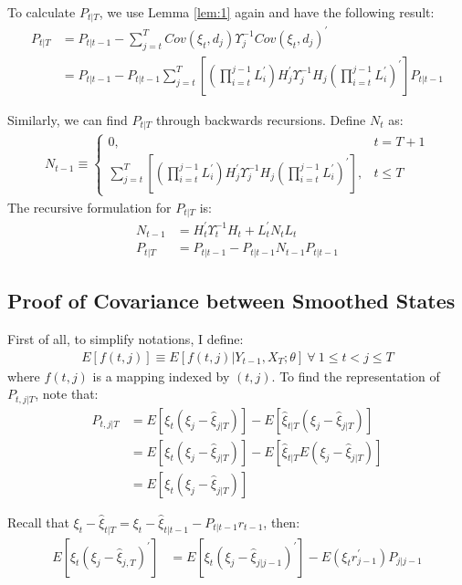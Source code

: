 \documentclass[12pt]{article}
\numberwithin{equation}{section}
\begin{document}
To calculate $P_{t|T}$, we use Lemma \ref{lem:1} again and have the following result:
\begin{align*}
    P_{t|T} &= P_{t|t-1} - \sum_{j=t}^TCov(\xi_t,d_j)\Upsilon_j^{-1}Cov(\xi_t,d_j)^{'} \\
    &=P_{t|t-1} - P_{t|t-1}\sum_{j=t}^{T}\left[\left(\prod_{i=t}^{j-1}L_{i}^{'}\right)H_j^{'}\Upsilon_j^{-1}H_j\left(\prod_{i=t}^{j-1}L_{i}^{'}\right)^{'}\right]P_{t|t-1}
\end{align*}

Similarly, we can find $P_{t|T}$ through backwards recursions. Define $N_t$ as:
\begin{align*}
    N_{t-1} \equiv \begin{cases}
        0, & t=T+1 \\
        \sum_{j=t}^{T}\left[\left(\prod_{i=t}^{j-1}L_{i}^{'}\right)H_j^{'}\Upsilon_j^{-1}H_j\left(\prod_{i=t}^{j-1}L_{i}^{'}\right)^{'}\right], & t\leq T
    \end{cases}
\end{align*}
The recursive formulation for $P_{t|T}$ is:
\begin{align*}
    N_{t-1} &= H_t^{'}\Upsilon_t^{-1}H_t + L_t^{'}N_tL_t \\
    P_{t|T} &= P_{t|t-1}- P_{t|t-1}N_{t-1}P_{t|t-1} 
\end{align*}

\subsection{Proof of Covariance between Smoothed States} \label{ap:cov_smooth}
First of all, to simplify notations, I define: 
\begin{align*}
    E[f(t,j)]\equiv E[f(t,j)|Y_{t-1},X_T;\theta] \  \forall\  1\leq t < j \leq T
\end{align*}
where $f(t,j)$ is a mapping indexed by $(t,j)$. To find the representation of $P_{t,j|T}$, note that:
\begin{align*}
    P_{t,j|T} &= E[\xi_t(\xi_j-\hat{\xi}_{j|T})] - E[\hat{\xi}_{t|T}(\xi_j-\hat{\xi}_{j|T})] \\
     &= E[\xi_t(\xi_j-\hat{\xi}_{j|T})] - E[\hat{\xi}_{t|T}E(\xi_j-\hat{\xi}_{j|T})] \\
     &= E[\xi_t(\xi_j-\hat{\xi}_{j|T})]
\end{align*}

Recall that $\xi_t-\hat{\xi}_{t|T} = \xi_t - \hat{\xi}_{t|t-1} - P_{t|t-1}r_{t-1}$, then:
\begin{align*}
    E[\xi_t(\xi_j-\hat{\xi}_{j,T})^{'}] &= E[\xi_t(\xi_j-\hat{\xi}_{j|j-1})^{'}] - E(\xi_tr_{j-1}^{'})P_{j|j-1}
\end{align*}
\end{document}
